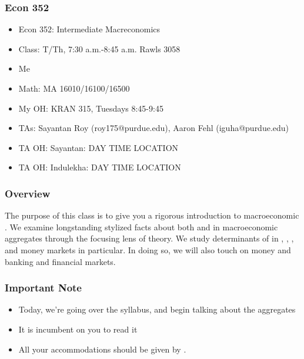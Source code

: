 \documentclass{beamer}
\author{Trevor Gallen}
\date{}
\begin{document}
\renewcommand*{\inserttotalframenumber}{\pageref{lastframe}}



\begin{frame}
\titlepage
\end{frame}

\begin{frame}
\frametitle[alignment=center]{Econ 352}
\begin{itemize}
\item Econ 352: Intermediate Macreconomics
\bigskip
\item Class:  T/Th, 7:30 a.m.-8:45 a.m. Rawls 3058
\bigskip
\item Me
\bigskip
\item Math:  MA 16010/16100/16500
\bigskip
\item My OH:  KRAN 315, Tuesdays 8:45-9:45
\bigskip
\item TAs:  Sayantan Roy (roy175@purdue.edu), Aaron Fehl (iguha@purdue.edu) 
\bigskip
\item TA OH:  Sayantan: DAY TIME LOCATION
\item TA OH: Indulekha:  DAY TIME LOCATION
\end{itemize}
\end{frame}

\begin{frame}
\frametitle[alignment=center]{Overview}
\linespread{1.6}
\begin{displayquote}
The purpose of this class is to give you a rigorous introduction to macroeconomic {}. We
examine longstanding stylized facts about both {} and {} in macroeconomic aggregates through the focusing lens of theory. We study determinants of {} in {}, {},
{}, and money markets in particular. In doing so, we will also touch on money and banking and financial markets.
\end{displayquote}
\end{frame}

\begin{frame}
\frametitle[alignment=center]{Important Note}
\begin{itemize}
\item Today, we're going over the syllabus, and begin talking about the aggregates
\bigskip
\item It is incumbent on you to read it
\bigskip
\item All your accommodations should be given by {}.
\bigskip
\end{itemize}
\end{frame}
\end{document}
